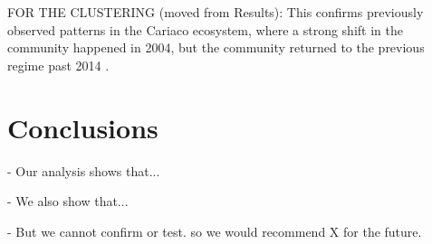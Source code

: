 \documentclass[draft]{agujournal2019}
\begin{document}
FOR THE CLUSTERING (moved from Results): This confirms previously observed patterns in the Cariaco ecosystem, where a strong shift in the community happened in 2004, but the community returned to the previous regime past 2014 \cite{taylor_ecosystem_2012, muller-karger_scientific_2019}.

\section{Conclusions}

- Our analysis shows that...

- We also show that...

- But we cannot confirm or test. so we would recommend X for the future.






%
%

%
%
%
%
%
%
%
%
\end{document}
